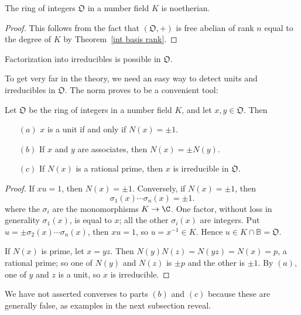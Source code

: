 \begin{theorem}
The ring of integers $\mathfrak{O}$ in a number field $K$ is noetherian.
\end{theorem}
\begin{proof}
This follows from the fact that $(\mathfrak{O},+)$ is free abelian of rank $n$ equal to the degree of $K$ by Theorem~\ref{int basis rank}.
\end{proof}
\begin{corollary}
Factorization into irreducibles is possible in $\mathfrak{O}$.
\end{corollary}
To get very far in the theory, we need an easy way to detect units and
irreducibles in $\mathfrak{O}$. The norm proves to be a convenient tool:
\begin{proposition}\label{alg int unit}
Let $\mathfrak{O}$ be the ring of integers in a number field $K$, and let $x,y\in\mathfrak{O}$. Then
\begin{itemize}
\item[$(a)$] $x$ is a unit if and only if $N(x)=\pm1$.
\item[$(b)$] If $x$ and $y$ are associates, then $N(x)=\pm N(y)$.
\item[$(c)$] If $N(x)$ is a rational prime, then $x$ is irreducible in $\mathfrak{O}$.
\end{itemize}
\end{proposition}
\begin{proof}
If $xu=1$, then $N(x)=\pm1$. Conversely, if $N(x)=\pm1$, then
\[\sigma_1(x)\cdots\sigma_n(x)=\pm1.\]
where the $\sigma_i$ are the monomorphisms $K\to\C$. One factor, without loss in generality $\sigma_1(x)$, is equal to $x$; all the other $\sigma_i(x)$ are integers. Put $u=\pm\sigma_2(x)\cdots\sigma_n(x)$, then $xu=1$, so $u=x^{-1}\in K$. Hence $u\in K\cap\mathbb{B}=\mathfrak{O}$.\par
If $N(x)$ is prime, let $x=yz$. Then $N(y)N(z)=N(yz)=N(x)=p$, a rational prime; so one of $N(y)$ and $N(z)$ is $\pm p$ and the other is $\pm 1$. By $(a)$, one of $y$ and $z$ is a unit, so $x$ is irreducible.
\end{proof}
We have not asserted converses to parts $(b)$ and $(c)$ because these are generally false, as examples in the next subsection reveal.
